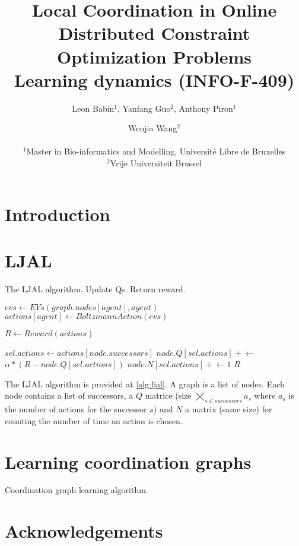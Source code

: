 \documentclass[letterpaper]{article}
\title{Local Coordination in Online Distributed Constraint Optimization Problems \citep{Brys2012} \\ \large Learning dynamics (INFO-F-409)}
\author{Leon Babin$^1$, Yanfang Guo$^2$, Anthony Piron$^1$ \and Wenjia Wang$^2$ \\
\mbox{}\\
$^1$Master in Bio-informatics and Modelling, Université Libre de Bruxelles \\
$^2$Vrije Universiteit Brussel}
\begin{document}
\maketitle

\begin{abstract}
  
\end{abstract}

\section{Introduction}


\section{LJAL}

\begin{algorithm}[tph]
  \caption{The LJAL algorithm. Update Qs. Return reward.}
  \label{alg:ljal}
  \begin{algorithmic}
    \State $evs\gets EVs(graph.nodes[agent], agent)$
    \State $actions[agent]\gets BoltzmannAction(evs)$
    \EndFor

    \State $R\gets Reward(actions)$

    \State $sel.actions\gets actions[node.successors]$
    \State $node.Q[sel.actions] \mathrel{+}\gets$
    \State \hspace{1cm}$\alpha * (R - node.Q[sel.actions])$
    \State $node.N[sel.actions]\mathrel{+}\gets 1$
    \EndFor
    \Return $R$
    \EndFunction
    \State
    \State {}
    \EndFor
  \end{algorithmic}
\end{algorithm}

The LJAL algorithm is provided at \ref{alg:ljal}. A graph is a list of nodes. Each node contains a list of successors, a $Q$ matrice (size $\bigtimes_{s \in successors} a_s$ where $a_s$ is the number of actions for the successor $s$) and $N$ a matrix (same size) for counting the number of time an action is chosen. 

\section{Learning coordination graphs}

\begin{algorithm}[tph]
  \caption{Coordination graph learning algorithm.}
  \label{alg:LCG}
  \begin{algorithmic}
    
    \EndFunction
  \end{algorithmic}
\end{algorithm}


\section{Acknowledgements}

\footnotesize


\end{document}
